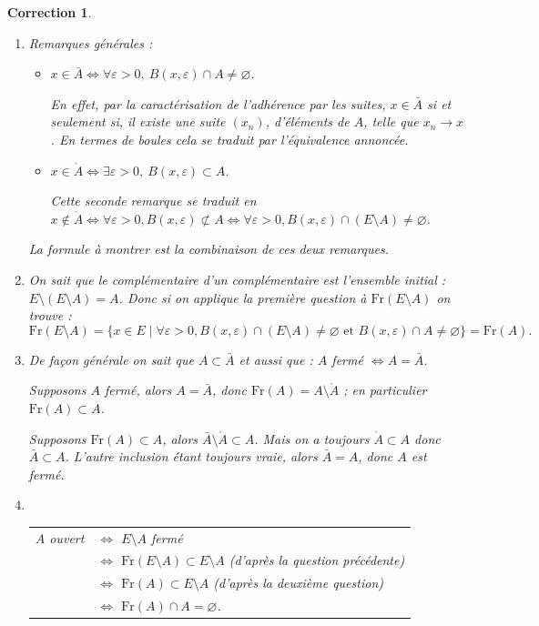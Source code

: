 \documentclass[11pt,a4paper]{article}
\renewcommand{\epsilon}{\varepsilon}
\theoremstyle{exostyle}
\newtheorem{cor}{Correction}
\newcommand{\correction}{\begin{cor}} \newcommand{\fincorrection}{\end{cor}}
\begin{document}
\correction
\begin{enumerate}
	\item 
	Remarques générales :
	\begin{itemize}
		\item $x \in \bar A \iff \forall\epsilon>0, \ B(x,\epsilon) \cap A \neq \varnothing$.
		
		En effet, par la caractérisation de l'adhérence par les suites, $x \in \bar A$ si et seulement si, il existe une suite $(x_n)$, d'éléments de $A$, telle que $x_n \to x$.
		En termes de boules cela se traduit par l'équivalence annoncée.
		
		\item $x \in \mathring{A} \iff \exists \epsilon>0, \ B(x,\epsilon) \subset A$.	
		
		Cette seconde remarque se traduit en $x \notin \mathring{A} \iff \forall\epsilon>0, B(x,\epsilon) \not\subset A \iff \forall\epsilon>0, B(x,\epsilon) \cap (E \setminus A) \neq \varnothing$.
			
	\end{itemize}
	
	La formule à montrer est la combinaison de ces deux remarques.
		
	
	\item On sait que le complémentaire d'un complémentaire est l'ensemble initial : $E \setminus (E \setminus A) = A$. Donc si on applique la première question à $\mathrm{Fr}(E\setminus A)$ 
	on trouve : 
	\[ 
	\mathrm{Fr}(E \setminus A)
	= \{x\in E \mid \forall \epsilon>0, B(x,\epsilon)\cap (E\setminus A)
	\neq\varnothing \text{\ et\ } B(x,\epsilon)\cap A \neq\varnothing\}
	= \mathrm{Fr}(A).
	\]

	\item De façon générale on sait que $A \subset \bar A$ et aussi que : $A$ fermé  $\iff A = \bar A$.
	
	Supposons $A$ fermé, alors $A = \bar A$, donc $\mathrm{Fr}(A)= A \setminus \mathring{A}$ ;  en particulier $\mathrm{Fr}(A) \subset A$.
		
	Supposons $\mathrm{Fr}(A) \subset A$, alors $\bar A \setminus \mathring{A} \subset A$.
	Mais on a toujours $\mathring{A} \subset A$ donc $\bar A \subset A$. L'autre inclusion étant toujours vraie, alors $\bar A = A$, donc $A$ est fermé.
	
	
	\item ~
	
	\begin{tabular}{ll}
	$A$ ouvert 
	&$\iff$ $E \setminus A$ fermé  \\
	&$\iff$ $\mathrm{Fr}(E\setminus A) \subset E \setminus A$ (d'après la question précédente) \\ &$\iff$ $\mathrm{Fr}(A) \subset E \setminus A$ (d'après la deuxième question) \\
	&$\iff$	$\mathrm{Fr}(A)\cap A=\varnothing$.
	\end{tabular}
\end{enumerate}
\fincorrection
\end{document}

